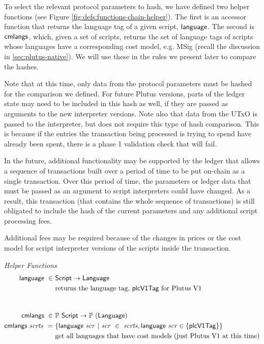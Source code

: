 To select the relevant protocol parameters to hash, we have defined two helper
functions (see Figure \ref{fig:defs:functions-chain-helper}). The first
is an accessor function that returns the language tag of a given script, $\mathsf{language}$.
The second is $\mathsf{cmlangs}$, which, given a set of scripts, returns the set
of language tags of scripts whose languages have a corresponding cost model,
e.g. MSig (recall the discussion in \ref{sec:plutus-native}).
We will use these in the rules we present later to compare the hashes.

Note that at this time, only data from the protocol parameters must be hashed
for the comparison we defined. For future Plutus versions, parts of the ledger
state may need to be included in this hash as well, if they are passed as
arguments to the new interpreter versions. Note also that data from the UTxO
is passed to the interpreter, but does not require this type of hash comparison.
This is because if the entries the transaction being processed is trying to
spend have already been spent, there is a phase 1 validation check that
will fail.

In the future, additional functionality may be supported by the ledger that
allows a sequence of transactions built over a period of time to be put on-chain
as a single transaction. Over this period of time, the parameters or ledger
data that must be passed as an argument to script interpreters could have changed.
As a result, this transaction (that contains the whole sequence of
transactions) is still obligated to include the hash of the current parameters
and any additional script processing fees.

Additional fees may be required because of the changes in prices or the cost model
for script interpreter versions of the scripts inside the transaction.

\begin{figure*}[htb]
  \emph{Helper Functions}
  \begin{align*}
    \fun{language} ~\in~& \Script \to \Language \\
    &\text{returns the language tag, $\mathsf{plcV1Tag}$ for Plutus V1} \\
    \nextdef
    \fun{cmlangs} ~\in~& \powerset{\Script} \to \powerset{(\Language)} \\
    \fun{cmlangs}~ \var{scrts} ~=~ & \{ \fun{language}~\var{scr} ~\vert~
      \var{scr}~\in~ \var{scrts}, \fun{language}~\var{scr} \in \{\mathsf{plcV1Tag} \}  \}\\
    &\text{get all languages that have cost models (just Plutus V1 at this time)} \\
  \end{align*}
  \caption{Languages and Plutus Versions}
  \label{fig:defs:functions-chain-helper}
\end{figure*}

